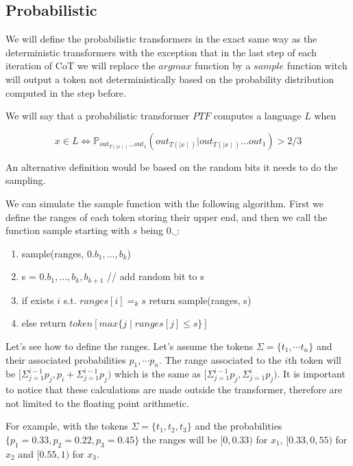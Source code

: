 \subsection*{Probabilistic}

We will define the probabilistic transformers in the exact same way as the deterministic transformers with the exception that in the last step of each iteration of CoT we will replace the $argmax$ function by a $sample$ function witch will output a token not deterministically based on the probability distribution computed in the step before.


We will say that a probabilistic transformer $PTF$ computes a language $L$ when

\begin{equation*}
    x \in L \iff \mathbb{P}_{out_{T(\mid x \mid)} \dots out_{1}}(out_{T(\mid x \mid)} | out_{T(\mid x \mid)} \dots out_{1}) > 2/3
\end{equation*}


An alternative definition would be based on the random bits it needs to do the sampling.

We can simulate the sample function with the following algorithm. 
First we define the ranges of each token storing their upper end, and then we call the function sample starting with $s$ being $0.\_$:


\begin{enumerate}
    \item sample(ranges, $0.b_1,\dots, b_k$)
    \item s = $0.b_1,\dots, b_k, b_{k+1}$ // add random bit to s
    \item if exists $i$ s.t. $ranges[i] = _k s$ return sample(ranges, s)
    \item else return $token[max \{ j \mid ranges[j] \leq s\}]$
\end{enumerate}


Let's see how to define the ranges. 
Let's assume the tokens $\Sigma = \{t_1, \cdots t_n \}$ and their associated probabilities $p_1, \cdots p_n$. 
The range associated to the $i$th token will be $[ \Sigma_{j=1}^{i-1} p_j , p_i + \Sigma_{j=1}^{i-1} p_j )$ which is the same as $[ \Sigma_{j=1}^{i-1} p_j, \Sigma_{j=1}^{i} p_j )$. 
It is important to notice that these calculations are made outside the transformer, therefore are not limited to the floating point arithmetic.

For example, with the tokens $\Sigma = \{t_1, t_2, t_3\}$ and the probabilities $\{p_1 = 0.33, p_2 = 0.22, p_3 = 0.45\}$ the ranges will be $[0, 0.33)$ for $x_1$, $[0.33, 0,55)$ for $x_2$ and $[0.55, 1)$ for $x_3$. 

